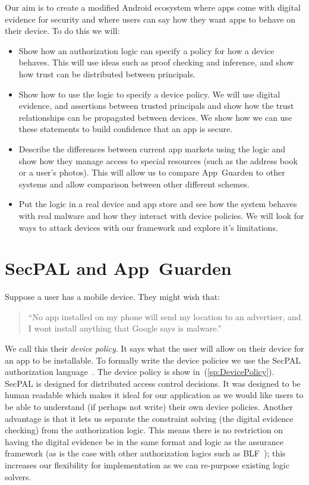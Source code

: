 \documentclass[]{llncs}
\newcommand{\eref}[1]{(\ref{#1})}
\begin{document}
Our aim is to create a modified Android ecosystem where apps
come with digital evidence for security and where users can say how
they want apps to behave on their device. To do this we will:
\begin{itemize}
  \item Show how an authorization logic can specify a policy for how a
    device behaves.  This will use ideas
    such as proof checking and inference, and show how trust can be
    distributed between principals.

  \item Show how to use the logic to specify a device policy. We will use
    digital evidence, and assertions between trusted principals and show how
    the trust relationships can be propagated between devices. We show how we
    can use these statements to build confidence that an app is secure.

  \item Describe the differences between current app markets using the
    logic and show how they manage access to special resources
    (such as the address book or a user's photos).  This will allow us to
    compare App~Guarden to other systems and allow comparison between other
    different schemes.

  \item Put the logic in a real device and app store and see how
    the system behaves with real malware and how they interact with device
    policies.  We will look for ways to attack devices with our framework and
    explore it's limitations.
\end{itemize}


\section{SecPAL and App~Guarden}

Suppose a user has a mobile device.  They might wish that:

\begin{quote}
  ``No app installed on my phone will send my location to an advertiser, and I
  wont install anything that Google says is malware.''
\end{quote}

We call this their \emph{device policy}.  It says what the user will allow on
their device for an app to be installable. To formally write the device
policies we use the SecPAL authorization language~\cite{Becker:2006vh}. The
device policy is show in~\eref{sp:DevicePolicy}. SecPAL is designed for
distributed access control decisions.  It was designed to be human readable
which makes it ideal for our application as we would like users to be able to
understand (if perhaps not write) their own device policies. Another advantage
is that it lets us separate the constraint solving (the digital evidence
checking) from the authorization logic.  This means there is no restriction on
having the digital evidence be in the same format and logic as the assurance
framework (as is the case with other authorization logics such as
BLF~\cite{Whitehead:2004bu}); this increases our flexibility for implementation
as we can re-purpose existing logic solvers.
\end{document}

